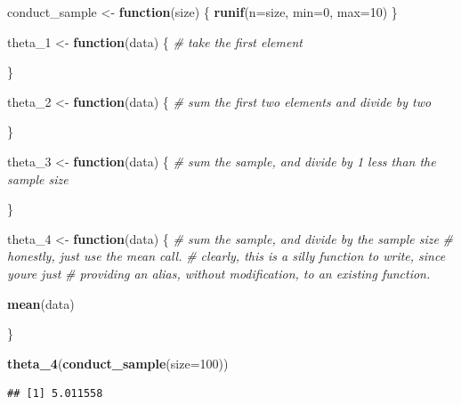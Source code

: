 \documentclass[
]{article}
\newenvironment{Shaded}{\begin{snugshade}}{\end{snugshade}}
\newcommand{\AttributeTok}[1]{\textcolor[rgb]{0.13,0.29,0.53}{#1}}
\newcommand{\CommentTok}[1]{\textcolor[rgb]{0.56,0.35,0.01}{\textit{#1}}}
\newcommand{\ControlFlowTok}[1]{\textcolor[rgb]{0.13,0.29,0.53}{\textbf{#1}}}
\newcommand{\DecValTok}[1]{\textcolor[rgb]{0.00,0.00,0.81}{#1}}
\newcommand{\FunctionTok}[1]{\textcolor[rgb]{0.13,0.29,0.53}{\textbf{#1}}}
\newcommand{\NormalTok}[1]{#1}
\newcommand{\OtherTok}[1]{\textcolor[rgb]{0.56,0.35,0.01}{#1}}
\theoremstyle{definition}
\theoremstyle{definition}
\theoremstyle{definition}
\theoremstyle{definition}
\theoremstyle{remark}
\begin{document}
\begin{Shaded}
\begin{Highlighting}[]
\NormalTok{conduct\_sample }\OtherTok{\textless{}{-}} \ControlFlowTok{function}\NormalTok{(size) \{ }
  \FunctionTok{runif}\NormalTok{(}\AttributeTok{n=}\NormalTok{size, }\AttributeTok{min=}\DecValTok{0}\NormalTok{, }\AttributeTok{max=}\DecValTok{10}\NormalTok{)}
\NormalTok{\}}
\end{Highlighting}
\end{Shaded}

\begin{Shaded}
\begin{Highlighting}[]
\NormalTok{theta\_1 }\OtherTok{\textless{}{-}} \ControlFlowTok{function}\NormalTok{(data) \{ }
  \CommentTok{\# take the first element}
  
\NormalTok{\}}

\NormalTok{theta\_2 }\OtherTok{\textless{}{-}} \ControlFlowTok{function}\NormalTok{(data) \{ }
  \CommentTok{\# sum the first two elements and divide by two}
  
\NormalTok{\}}

\NormalTok{theta\_3 }\OtherTok{\textless{}{-}} \ControlFlowTok{function}\NormalTok{(data) \{ }
  \CommentTok{\# sum the sample, and divide by 1 less than the sample size}
  
\NormalTok{\}}

\NormalTok{theta\_4 }\OtherTok{\textless{}{-}} \ControlFlowTok{function}\NormalTok{(data) \{ }
  \CommentTok{\# sum the sample, and divide by the sample size }
  \CommentTok{\# honestly, just use the mean call. }
  \CommentTok{\# clearly, this is a silly function to write, since you\textquotesingle{}re just }
  \CommentTok{\# providing an alias, without modification, to an existing function. }
  
  \FunctionTok{mean}\NormalTok{(data)}
  
\NormalTok{\}}
\end{Highlighting}
\end{Shaded}

\begin{Shaded}
\begin{Highlighting}[]
\FunctionTok{theta\_4}\NormalTok{(}\FunctionTok{conduct\_sample}\NormalTok{(}\AttributeTok{size=}\DecValTok{100}\NormalTok{))}
\end{Highlighting}
\end{Shaded}

\begin{verbatim}
## [1] 5.011558
\end{verbatim}
\end{document}
